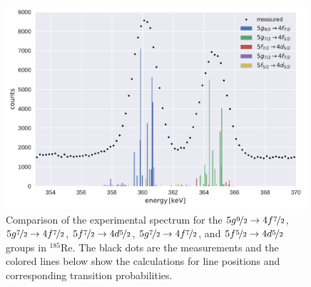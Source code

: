 \begin{figure}%
\centering
\includegraphics[width=0.99\textwidth]{pics/comparison}
\caption{
Comparison of the experimental spectrum for the $5g\nicefrac{9}{2}\rightarrow4f\nicefrac{7}{2}$, $5g\nicefrac{7}{2}\rightarrow4f\nicefrac{7}{2}$, $5f\nicefrac{7}{2}\rightarrow4d\nicefrac{5}{2}$, $5g\nicefrac{7}{2}\rightarrow4f\nicefrac{7}{2}$, and $5f\nicefrac{5}{2}\rightarrow4d\nicefrac{5}{2}$ groups in $^{185}$Re. The black dots are the measurements and the colored lines below show the calculations for line positions and corresponding transition probabilities.
}
\label{fig:re54}
\end{figure}
%
%
%
%
%
